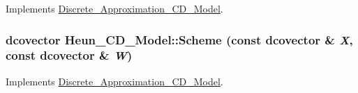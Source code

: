 Implements \hyperlink{class_discrete___approximation___c_d___model_7a3dcae055d90be0b8a231eff961e2a2}{Discrete\_\-Approximation\_\-CD\_\-Model}.\hypertarget{class_heun___c_d___model_98a85a23296e6c9f422f12063ece307b}{
\subsubsection[{Scheme}]{\setlength{\rightskip}{0pt plus 5cm}dcovector Heun\_\-CD\_\-Model::Scheme (const dcovector \& {\em X}, \/  const dcovector \& {\em W})}}
\label{class_heun___c_d___model_98a85a23296e6c9f422f12063ece307b}




Implements \hyperlink{class_discrete___approximation___c_d___model_1ea9a1d618890fc51db6fa98eeb7af7f}{Discrete\_\-Approximation\_\-CD\_\-Model}.